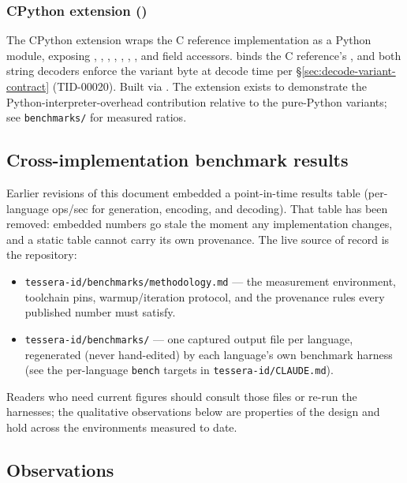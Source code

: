 \subsubsection{CPython extension ()}

The CPython extension wraps the C reference implementation as a Python module, exposing , , , , , , , and field accessors.  binds the C reference's , and both string decoders enforce the variant byte at decode time per §\ref{sec:decode-variant-contract} (TID-00020). Built via . The extension exists to demonstrate the Python-interpreter-overhead contribution relative to the pure-Python variants; see \texttt{benchmarks/} for measured ratios.

\subsection{Cross-implementation benchmark results}

Earlier revisions of this document embedded a point-in-time results table (per-language ops/sec for generation, encoding, and decoding). That table has been removed: embedded numbers go stale the moment any implementation changes, and a static table cannot carry its own provenance. The live source of record is the repository:

\begin{itemize}
  \item \texttt{tessera-id/benchmarks/methodology.md} --- the measurement environment, toolchain pins, warmup/iteration protocol, and the provenance rules every published number must satisfy.
  \item \texttt{tessera-id/benchmarks/} --- one captured output file per language, regenerated (never hand-edited) by each language's own benchmark harness (see the per-language \texttt{bench} targets in \texttt{tessera-id/CLAUDE.md}).
\end{itemize}

Readers who need current figures should consult those files or re-run the harnesses; the qualitative observations below are properties of the design and hold across the environments measured to date.

\subsection{Observations}

